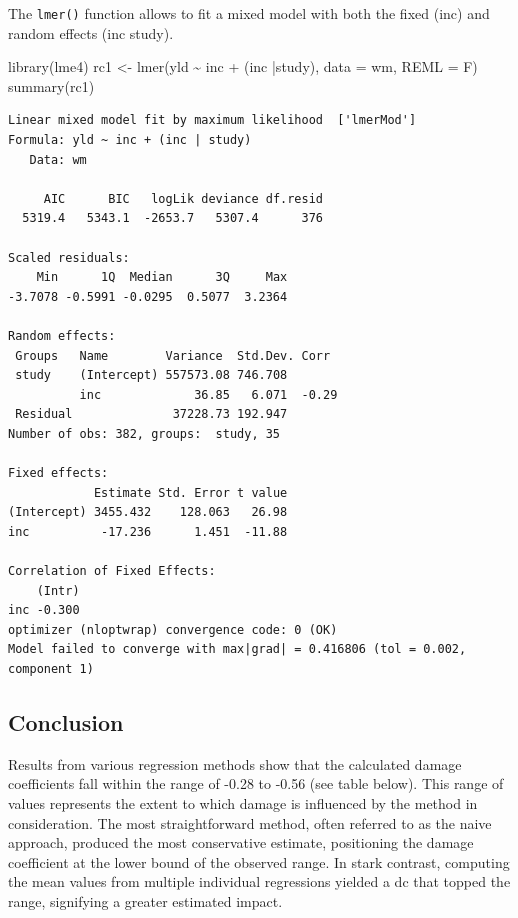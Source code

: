 \documentclass[
  letterpaper,
]{book}
\newenvironment{Shaded}{\begin{snugshade}}{\end{snugshade}}
\newcommand{\AttributeTok}[1]{\textcolor[rgb]{0.40,0.45,0.13}{#1}}
\newcommand{\FunctionTok}[1]{\textcolor[rgb]{0.28,0.35,0.67}{#1}}
\newcommand{\NormalTok}[1]{\textcolor[rgb]{0.00,0.23,0.31}{#1}}
\newcommand{\OtherTok}[1]{\textcolor[rgb]{0.00,0.23,0.31}{#1}}
\newcommand{\SpecialCharTok}[1]{\textcolor[rgb]{0.37,0.37,0.37}{#1}}
\begin{document}
The \texttt{lmer()} function allows to fit a mixed model with both the
fixed (inc) and random effects (inc \textbar{} study).

\begin{Shaded}
\begin{Highlighting}[]
\FunctionTok{library}\NormalTok{(lme4)}
\NormalTok{rc1 }\OtherTok{\textless{}{-}} \FunctionTok{lmer}\NormalTok{(yld }\SpecialCharTok{\textasciitilde{}}\NormalTok{ inc }\SpecialCharTok{+}\NormalTok{ (inc }\SpecialCharTok{|}\NormalTok{study), }\AttributeTok{data =}\NormalTok{ wm, }
            \AttributeTok{REML =}\NormalTok{ F)}
\FunctionTok{summary}\NormalTok{(rc1)}
\end{Highlighting}
\end{Shaded}

\begin{verbatim}
Linear mixed model fit by maximum likelihood  ['lmerMod']
Formula: yld ~ inc + (inc | study)
   Data: wm

     AIC      BIC   logLik deviance df.resid 
  5319.4   5343.1  -2653.7   5307.4      376 

Scaled residuals: 
    Min      1Q  Median      3Q     Max 
-3.7078 -0.5991 -0.0295  0.5077  3.2364 

Random effects:
 Groups   Name        Variance  Std.Dev. Corr 
 study    (Intercept) 557573.08 746.708       
          inc             36.85   6.071  -0.29
 Residual              37228.73 192.947       
Number of obs: 382, groups:  study, 35

Fixed effects:
            Estimate Std. Error t value
(Intercept) 3455.432    128.063   26.98
inc          -17.236      1.451  -11.88

Correlation of Fixed Effects:
    (Intr)
inc -0.300
optimizer (nloptwrap) convergence code: 0 (OK)
Model failed to converge with max|grad| = 0.416806 (tol = 0.002, component 1)
\end{verbatim}

\hypertarget{conclusion}{%
\subsection{Conclusion}\label{conclusion}}

Results from various regression methods show that the calculated damage
coefficients fall within the range of -0.28 to -0.56 (see table below).
This range of values represents the extent to which damage is influenced
by the method in consideration. The most straightforward method, often
referred to as the naive approach, produced the most conservative
estimate, positioning the damage coefficient at the lower bound of the
observed range. In stark contrast, computing the mean values from
multiple individual regressions yielded a dc that topped the range,
signifying a greater estimated impact.
\end{document}
